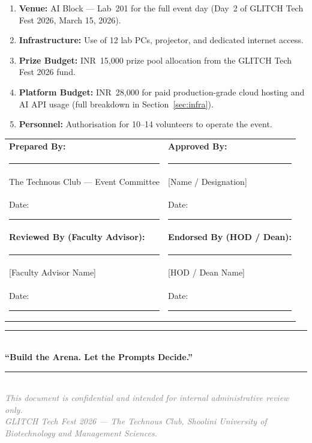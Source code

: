 \documentclass[11pt, a4paper]{article}
\begin{document}
\begin{tcolorbox}[greenbox, title={Formal Approval Requested For}]
\begin{enumerate}[leftmargin=1cm, itemsep=3pt]
    \item \textbf{Venue:} AI Block --- Lab~201 for the full event day (Day~2 of GLITCH Tech Fest 2026, March 15, 2026).
    \item \textbf{Infrastructure:} Use of 12 lab PCs, projector, and dedicated internet access.
    \item \textbf{Prize Budget:} INR~15,000 prize pool allocation from the GLITCH Tech Fest 2026 fund.
    \item \textbf{Platform Budget:} INR~28,000 for paid production-grade cloud hosting and AI API usage (full breakdown in Section~\ref{sec:infra}).
    \item \textbf{Personnel:} Authorisation for 10--14 volunteers to operate the event.
\end{enumerate}
\end{tcolorbox}

\vspace{1cm}

\begin{tabularx}{\textwidth}{X X}
\textbf{Prepared By:} & \textbf{Approved By:} \\[1.2cm]
\rule{5.5cm}{0.5pt} & \rule{5.5cm}{0.5pt} \\
The Technous Club --- Event Committee & {[Name / Designation]} \\
Date: \rule{2.8cm}{0.5pt} & Date: \rule{2.8cm}{0.5pt} \\[1.1cm]
\textbf{Reviewed By (Faculty Advisor):} & \textbf{Endorsed By (HOD / Dean):} \\[1.2cm]
\rule{5.5cm}{0.5pt} & \rule{5.5cm}{0.5pt} \\
{[Faculty Advisor Name]} & {[HOD / Dean Name]} \\
Date: \rule{2.8cm}{0.5pt} & Date: \rule{2.8cm}{0.5pt} \\
\end{tabularx}

\vfill
\begin{center}
\textcolor{accentgold}{\rule{0.55\textwidth}{1.5pt}}\\[0.45cm]
{\large\bfseries\textcolor{primaryblue}{``Build the Arena. Let the Prompts Decide.''}}\\[0.4cm]
\textcolor{gray}{\rule{0.3\textwidth}{0.5pt}}\\[0.3cm]
\textcolor{gray}{\small\textit{This document is confidential and intended for internal administrative review only.}}\\
\textcolor{gray}{\small\textit{GLITCH Tech Fest 2026 --- The Technous Club, Shoolini University of Biotechnology and Management Sciences.}}
\end{center}
\end{document}
